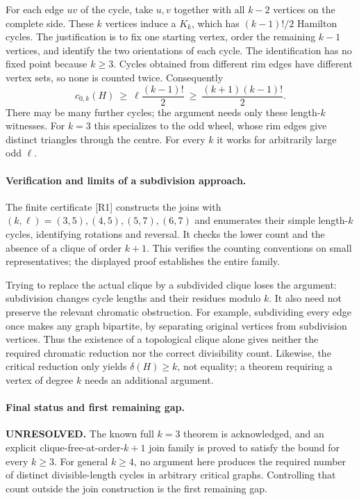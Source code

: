 \documentclass[11pt,a4paper]{article}
\begin{document}
For each edge $uv$ of the cycle, take $u,v$ together with all $k-2$
vertices on the complete side. These $k$ vertices induce a $K_k$, which
has $(k-1)!/2$ Hamilton cycles. The justification is to fix one starting
vertex, order the remaining $k-1$ vertices, and identify the two
orientations of each cycle. The identification has no fixed point
because $k\ge3$. Cycles obtained from different rim edges have different
vertex sets, so none is counted twice. Consequently
\[
 c_{0,k}(H)\ \ge\ \ell\frac{(k-1)!}{2}
       \ \ge\ \frac{(k+1)(k-1)!}{2}.
\]
There may be many further cycles; the argument needs only these
length-$k$ witnesses. For $k=3$ this specializes to the odd wheel, whose
rim edges give distinct triangles through the centre. For every $k$ it
works for arbitrarily large odd $\ell$.

\paragraph{Verification and limits of a subdivision approach.}
The finite certificate [R1] constructs the joins with
$(k,\ell)=(3,5),(4,5),(5,7),(6,7)$ and enumerates their simple
length-$k$ cycles, identifying rotations and reversal. It checks the
lower count and the absence of a clique of order $k+1$. This verifies
the counting conventions on small representatives; the displayed proof
establishes the entire family.

Trying to replace the actual clique by a subdivided clique loses the
argument: subdivision changes cycle lengths and their residues modulo
$k$. It also need not preserve the relevant chromatic obstruction. For
example, subdividing every edge once makes any graph bipartite, by
separating original vertices from subdivision vertices. Thus the
existence of a topological clique alone gives neither the required
chromatic reduction nor the correct divisibility count. Likewise, the
critical reduction only yields $\delta(H)\ge k$, not equality; a theorem
requiring a vertex of degree $k$ needs an additional argument.

\paragraph{Final status and first remaining gap.}
\textbf{UNRESOLVED.} The known full $k=3$ theorem is acknowledged, and
an explicit clique-free-at-order-$k+1$ join family is proved to satisfy
the bound for every $k\ge3$. For general $k\ge4$, no argument here
produces the required number of distinct divisible-length cycles in
arbitrary critical graphs. Controlling that count outside the join
construction is the first remaining gap.
\end{document}
